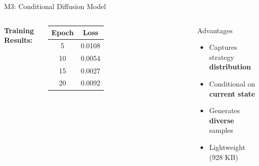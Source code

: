 \documentclass[aspectratio=169]{beamer}
\begin{document}
\begin{frame}{M3: Conditional Diffusion Model}
\begin{columns}

\textbf{Training Results:}

\begin{table}
\centering
\small
\begin{tabular}{cc}
\toprule
Epoch & Loss \\
\midrule
5 & 0.0108 \\
10 & 0.0054 \\
15 & 0.0027 \\
20 & 0.0092 \\
\bottomrule
\end{tabular}
\end{table}

\vspace{0.5em}
\begin{block}{Advantages}
\begin{itemize}
    \item Captures strategy \textbf{distribution}
    \item Conditional on \textbf{current state}
    \item Generates \textbf{diverse} samples
    \item Lightweight (928 KB)
\end{itemize}
\end{block}

\end{columns}

\end{frame}
\end{document}
